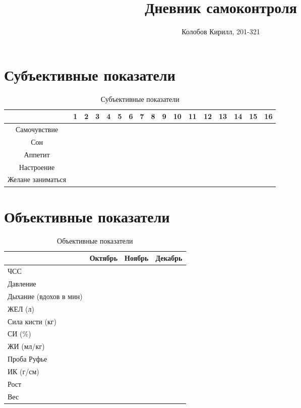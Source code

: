 \documentclass[a4paper,12pt]{report}
\date{}
\author{Колобов Кирилл, 201-321}
\title{Дневник самоконтроля}
\begin{document}
\maketitle
\newpage

\section*{Субъективные показатели}
\begin{table}[!h]
\begin{flushleft}
    \begin{tabular}[l]{|c|c|c|c|c|c|c|c|c|c|c|c|c|c|c|c|c|}
    \hline
        & 1 & 2 & 3 & 4 & 5 & 6 & 7 & 8 & 9 & 10 & 11 & 12 & 13 & 14 & 15 & 16 \\ \hline
        Самочувствие & & & & & & & & & & & & & & & & \\ \hline 
        Сон & & & & & & & & & & & & & & & & \\ \hline 
        Аппетит & & & & & & & & & & & & & & & & \\ \hline 
        Настроение & & & & & & & & & & & & & & & & \\ \hline 
        Желане заниматься & & & & & & & & & & & & & & & & \\ \hline 
    \end{tabular}
\caption{Субъективные показатели}
\end{flushleft}
\end{table}

\section*{Объективные показатели}
\begin{table}[!h]
    \begin{tabular}{|l|l|l|l|}
        \hline
        \textbf{} & \textbf{Октябрь} & \textbf{Ноябрь} & \textbf{Декабрь} \\ \hline
        ЧСС & & & \\ \hline
        Давление & & & \\ \hline
            Дыхание (вдохов в мин) & & & \\ \hline
            ЖЕЛ (л) & & & \\ \hline
            Сила кисти (кг) & & & \\ \hline
            СИ (\%) & & & \\ \hline
            ЖИ (мл/кг) & & & \\ \hline
            Проба Руфье & & & \\ \hline
            ИК (г/см) & & & \\ \hline
            Рост & & & \\ \hline
            Вес & & & \\ \hline
    \end{tabular}
    \caption{Объективные показатели}
\end{table}
\end{document}
